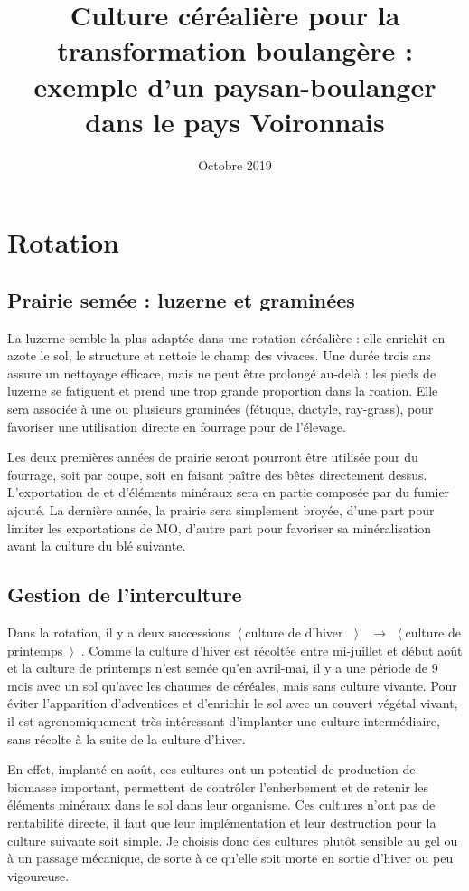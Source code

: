 \documentclass{article}
\title{Culture céréalière pour la transformation boulangère : exemple d'un paysan-boulanger dans le pays Voironnais}
\date{Octobre 2019}
\begin{document}
\section{Rotation}

\subsection{Prairie semée : luzerne et graminées}

La luzerne semble la plus adaptée dans une rotation céréalière : elle enrichit en azote le sol, le structure et nettoie le champ des vivaces. Une durée trois ans assure un nettoyage efficace, mais ne peut être prolongé au-delà : les pieds de luzerne se fatiguent et prend une trop grande proportion dans la roation. Elle sera associée à une ou plusieurs graminées (fétuque, dactyle, ray-grass), pour favoriser une utilisation directe en fourrage pour de l'élevage.

Les deux premières années de prairie seront pourront être utilisée pour du fourrage, soit par coupe, soit en faisant paître des bêtes directement dessus. L'exportation de et d'éléments minéraux sera en partie composée par du fumier ajouté. La dernière année, la prairie sera simplement broyée, d'une part pour limiter les exportations de MO, d'autre part pour favoriser sa minéralisation avant la culture du blé suivante.

\subsection{Gestion de l'interculture}

Dans la rotation, il y a deux successions $\left\langle \right. $culture de d'hiver $\left\rangle \right. $ $\longrightarrow$ $\left\langle \right. $culture de printemps$\left\rangle \right. $. Comme la culture d'hiver est récoltée entre mi-juillet et début août et la culture de printemps n'est semée qu'en avril-mai, il y a une période de 9 mois avec un sol qu'avec les chaumes de céréales, mais sans culture vivante. Pour éviter l'apparition d'adventices et d'enrichir le sol avec un couvert végétal vivant, il est agronomiquement très intéressant d'implanter une culture intermédiaire, sans récolte à la suite de la culture d'hiver. 

En effet, implanté en août, ces cultures ont un potentiel de production de biomasse important, permettent de contrôler l'enherbement et de retenir les éléments minéraux dans le sol dans leur organisme. Ces cultures n'ont pas de rentabilité directe, il faut que leur implémentation et leur destruction pour la culture suivante soit simple. Je choisis donc des cultures plutôt sensible au gel ou à un passage mécanique, de sorte à ce qu'elle soit morte en sortie d'hiver ou peu vigoureuse. 
\end{document}
